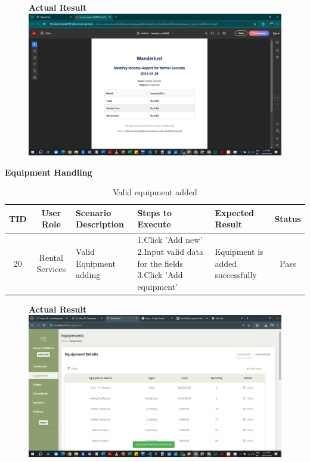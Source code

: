 \begin{figure}[h!]
    \centering
    \textbf{Actual Result}
    \includegraphics[width=1\textwidth]{Images/Test Cases/19. valid report.png}
\end{figure}
\clearpage


\textbf{Equipment Handling}\\
\begin{table}[ht]
\centering
\begin{tabularx}{\textwidth}{|c|c|X|X|X|c|}
\hline
\textbf{TID} & \textbf{User Role} & \textbf{Scenario Description} & \textbf{Steps to Execute} & \textbf{Expected Result} & \textbf{Status} \\ \hline
20 & Rental Services & Valid Equipment adding & 1.Click 'Add new' \newline2.Input valid data for the fields \newline3.Click 'Add equipment' & Equipment is added successfully & Pass \\ \hline
\end{tabularx}
\caption{Valid equipment added}
\end{table}

\begin{figure}[h!]
    \centering
    \textbf{Actual Result}
    \includegraphics[width=1\textwidth]{Images/Test Cases/20. Valid Equipment adding.png}
\end{figure}
\clearpage



